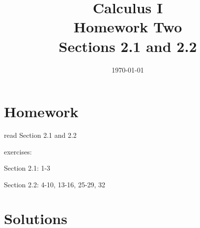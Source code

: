 \documentclass[letterpaper, landscape]{exam}
\title{Calculus I \\ Homework Two \\ Sections 2.1 and 2.2}
\author{}
\date{\today}
\begin{document}
  \maketitle

  \section{Homework}
    \begin{itemize*}
      \item read Section 2.1 and 2.2
      \item exercises: 
        \begin{itemize*}
          \item Section 2.1: 1-3 
          \item Section 2.2: 4-10, 13-16, 25-29, 32
        \end{itemize*}
    \end{itemize*}

  \ifprintanswers

    \section{Solutions}
\end{document}
